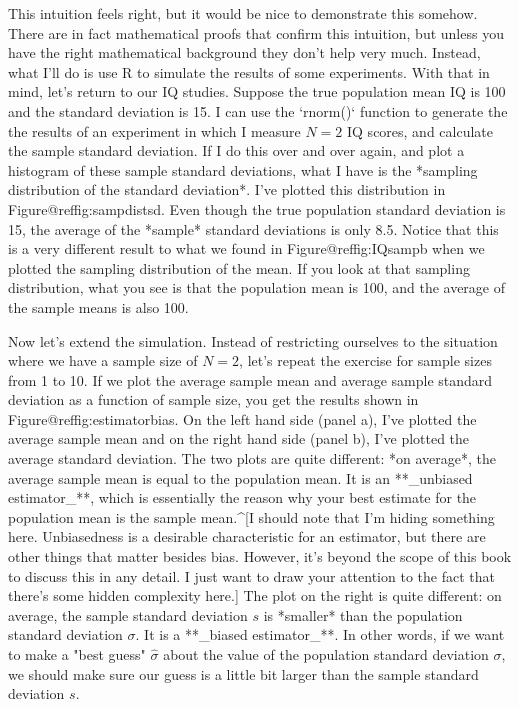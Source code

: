 This intuition feels right, but it would be nice to demonstrate this somehow. There are in fact mathematical proofs that confirm this intuition, but unless you have the right mathematical background they don't help very much. Instead, what I'll do is use R to simulate the results of some experiments. With that in mind, let's return to our IQ studies. Suppose the true population mean IQ is 100 and the standard deviation is 15. I can use the `rnorm()` function to generate the the results of an experiment in which I measure $N=2$ IQ scores, and calculate the sample standard deviation. If I do this over and over again, and plot a histogram of these sample standard deviations, what I have is the *sampling distribution of the standard deviation*. I've plotted this distribution in Figure@reffig:sampdistsd. Even though the true population standard deviation is 15, the average of the *sample* standard deviations is only 8.5. Notice that this is a very different result to what we found in Figure@reffig:IQsampb when we plotted the sampling distribution of the mean. If you look at that sampling distribution, what you see is that the population mean is 100, and the average of the sample means is also 100. 

Now let's extend the simulation. Instead of restricting ourselves to the situation where we have a sample size of $N=2$, let's repeat the exercise for sample sizes from 1 to 10. If we plot the average sample mean and average sample standard deviation as a function of sample size, you get the results shown in Figure@reffig:estimatorbias. On the left hand side (panel a), I've plotted the average sample mean and on the right hand side (panel b), I've plotted the average standard deviation. The two plots are quite different: *on average*, the average sample mean is equal to the population mean. It is an **_unbiased estimator_**, which is essentially the reason why your best estimate for the population mean is the sample mean.^[I should note that I'm hiding something here. Unbiasedness is a desirable characteristic for an estimator, but there are other things that matter besides bias. However, it's beyond the scope of this book to discuss this in any detail. I just want to draw your attention to the fact that there's some hidden complexity here.] The plot on the right is quite different: on average, the sample standard deviation $s$ is *smaller* than the population standard deviation $\sigma$. It is a **_biased estimator_**. In other words, if we want to make a "best guess" $\hat\sigma$ about the value of the population standard deviation $\sigma$, we should make sure our guess is a little bit larger than the sample standard deviation $s$. 


